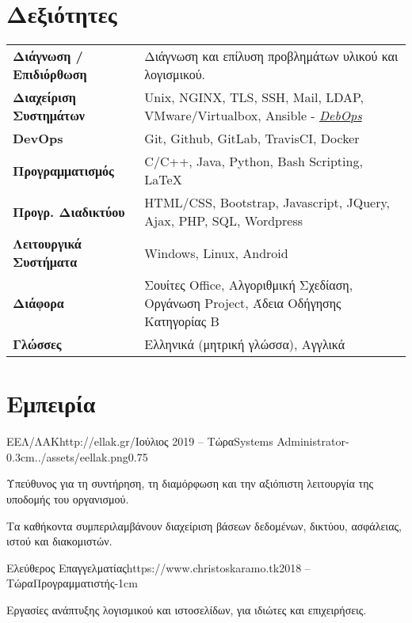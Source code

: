 \documentclass{mycv}
\begin{document}
	\section{Δεξιότητες}
	\begin{tabular}{m{4.5cm} m{13cm}}
		\textbf{Διάγνωση / Επιδιόρθωση}     & Διάγνωση και επίλυση προβλημάτων υλικού και λογισμικού. \\
		\textbf{Διαχείριση Συστημάτων}		& Unix, NGINX, TLS, SSH, Mail, LDAP, VMware/Virtualbox, Ansible - \href{https://debops.org}{\textit{DebOps}} \\
		\textbf{DevOps}	                    & Git, Github, GitLab, TravisCI, Docker \\
		\textbf{Προγραμματισμός} 	 	  	& C/C++, Java, Python, Bash Scripting, \LaTeX \\
		\textbf{Προγρ. Διαδικτύου}	  		& HTML/CSS, Bootstrap, Javascript, JQuery, Ajax, PHP, SQL, Wordpress \\
		\textbf{Λειτουργικά Συστήματα}   	& Windows, Linux, Android \\
		\textbf{Διάφορα}        		 	& Σουίτες Office, Αλγοριθμική Σχεδίαση, Οργάνωση Project, Άδεια Οδήγησης Κατηγορίας Β \\
		\textbf{Γλώσσες} 			   		& Ελληνικά (μητρική γλώσσα), Αγγλικά 
	\end{tabular}

	\section{Εμπειρία}
	
	\begin{EntryDatedLogo}{ΕΕΛ/ΛΑΚ}{http://ellak.gr/}{Ιούλιος 2019 -- Τώρα}{Systems Administrator}{-0.3cm}{../assets/eellak.png}{0.75}
		\begin{Itemize}
			\item Υπεύθυνος για τη συντήρηση, τη διαμόρφωση και την αξιόπιστη λειτουργία της υποδομής του οργανισμού. 
			\item Τα καθήκοντα συμπεριλαμβάνουν διαχείριση βάσεων δεδομένων, δικτύου, ασφάλειας, ιστού και διακομιστών.
		\end{Itemize}
	\end{EntryDatedLogo}

	\begin{EntryDated}{Ελεύθερος Επαγγελματίας}{https://www.christoskaramo.tk}{2018 -- Τώρα}{Προγραμματιστής}{-1cm}
	\begin{Itemize}
		\item Εργασίες ανάπτυξης λογισμικού και ιστοσελίδων, για ιδιώτες και επιχειρήσεις.
	\end{Itemize}
	\end{EntryDated}
\end{document}
